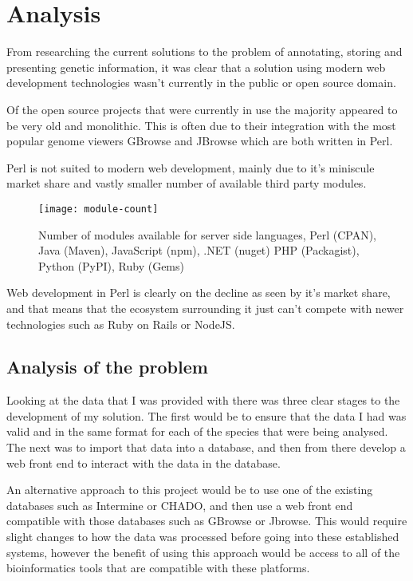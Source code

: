 \section{Analysis}

From researching the current solutions to the problem of annotating, storing and presenting genetic information, it was clear that a solution using modern web development technologies wasn't currently in the public or open source domain. 

Of the open source projects that were currently in use the majority appeared to be very old and monolithic. This is often due to their integration with the most popular genome viewers GBrowse\cite{gbrowse} and JBrowse\cite{jbrowse} which are both written in Perl.

Perl is not suited to modern web development, mainly due to it's miniscule market share\cite{perl-market} and vastly smaller number of available third party modules. 

\begin{figure}[ht!]
\begin{center}
\texttt{[image: module-count]}
\caption{Number of modules available for server side languages, Perl (CPAN), Java (Maven), JavaScript (npm), .NET (nuget) PHP (Packagist), Python (PyPI), Ruby (Gems)\cite{modulecounts}}
\end{center}
\end{figure}

Web development in Perl is clearly on the decline as seen by it's market share\cite{perl-market}, and that means that the ecosystem surrounding it just can't compete with newer technologies such as Ruby on Rails or NodeJS.

\subsection{Analysis of the problem}
Looking at the data that I was provided with there was three clear stages to the development of my solution. The first would be to ensure that the data I had was valid and in the same format for each of the species that were being analysed. The next was to import that data into a database, and then from there develop a web front end to interact with the data in the database. 

An alternative approach to this project would be to use one of the existing databases such as Intermine\cite{intermine} or CHADO\cite{chado}, and then use a web front end compatible with those databases such as GBrowse\cite{gbrowse} or Jbrowse\cite{jbrowse}. This would require slight changes to how the data was processed before going into these established systems, however the benefit of using this approach would be access to all of the bioinformatics tools that are compatible with these platforms.

